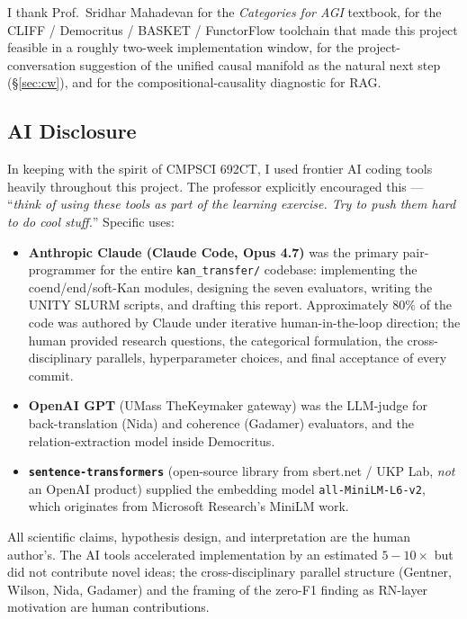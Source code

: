 \documentclass[10pt,letterpaper]{article}
\begin{document}
I thank Prof.\ Sridhar Mahadevan for the \emph{Categories for AGI} textbook, for the CLIFF / Democritus / BASKET / FunctorFlow toolchain that made this project feasible in a roughly two-week implementation window, for the project-conversation suggestion of the unified causal manifold as the natural next step (\S\ref{sec:cw}), and for the compositional-causality diagnostic for RAG.

\subsection*{AI Disclosure}

In keeping with the spirit of CMPSCI 692CT, I used frontier AI coding tools heavily throughout this project. The professor explicitly encouraged this --- ``\emph{think of using these tools as part of the learning exercise. Try to push them hard to do cool stuff.}'' Specific uses:

\begin{itemize}
\item \textbf{Anthropic Claude (Claude Code, Opus 4.7)} was the primary pair-programmer for the entire \texttt{kan\_transfer/} codebase: implementing the coend/end/soft-Kan modules, designing the seven evaluators, writing the UNITY SLURM scripts, and drafting this report. Approximately $80\%$ of the code was authored by Claude under iterative human-in-the-loop direction; the human provided research questions, the categorical formulation, the cross-disciplinary parallels, hyperparameter choices, and final acceptance of every commit.
\item \textbf{OpenAI GPT} (UMass TheKeymaker gateway) was the LLM-judge for back-translation (Nida) and coherence (Gadamer) evaluators, and the relation-extraction model inside Democritus.
\item \textbf{\texttt{sentence-transformers}} (open-source library from sbert.net / UKP Lab, \emph{not} an OpenAI product) supplied the embedding model \texttt{all-MiniLM-L6-v2}, which originates from Microsoft Research's MiniLM work.
\end{itemize}

All scientific claims, hypothesis design, and interpretation are the human author's. The AI tools accelerated implementation by an estimated $5{-}10{\times}$ but did not contribute novel ideas; the cross-disciplinary parallel structure (Gentner, Wilson, Nida, Gadamer) and the framing of the zero-F1 finding as RN-layer motivation are human contributions.
\end{document}
